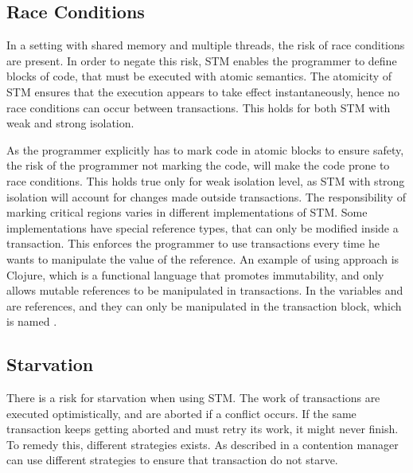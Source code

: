 \subsection{Race Conditions}
In a setting with shared memory and multiple threads, the risk of race conditions are present. In order to negate this risk, \ac{STM} enables the programmer to define blocks of code, that must be executed with atomic semantics. The atomicity of \ac{STM} ensures that the execution appears to take effect instantaneously, hence no race conditions can occur between transactions. This holds for both \ac{STM} with weak and strong isolation.

As the programmer explicitly has to mark code in atomic blocks to ensure safety, the risk of the programmer not marking the code, will make the code prone to race conditions. This holds true only for weak isolation level, as \ac{STM} with strong isolation will account for changes made outside transactions. The responsibility of marking critical regions varies in different implementations of \ac{STM}. Some implementations have special reference types, that can only be modified inside a transaction. This enforces the programmer to use transactions every time he wants to manipulate the value of the reference. An example of using approach is Clojure, which is a functional language that promotes immutability, and only allows mutable references to be manipulated in transactions. In  the variables  and  are references, and they can only be manipulated in the transaction block, which is named .

\subsection{Starvation}
There is a risk for starvation when using \ac{STM}. The work of transactions are executed optimistically, and are aborted if a conflict occurs. If the same transaction keeps getting aborted and must retry its work, it might never finish. To remedy this, different strategies exists. As described in  a contention manager can use different strategies to ensure that transaction do not starve.

